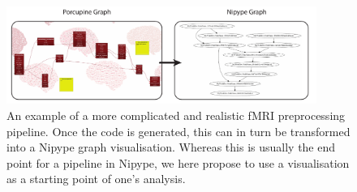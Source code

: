 \begin{figure}[!ht]
	\centering
	\includegraphics[width=0.9\textwidth, clip=true]{./Chapters/05_Porcupine/./Images/pork_graph.pdf}
	\caption{An example of a more complicated and realistic fMRI preprocessing pipeline. Once the code is generated, this can in turn be transformed into a Nipype graph visualisation. Whereas this is usually the end point for a pipeline in Nipype, we here propose to use a visualisation as a starting point of one's analysis.}
	\label{fig:porcupine-advanced}
\end{figure}